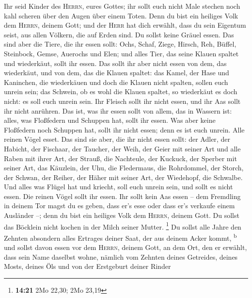  Ihr seid Kinder des \textsc{Herrn}, eures Gottes; ihr
sollt euch nicht Male stechen noch kahl scheren über den Augen über
einem Toten.  Denn du bist ein heiliges Volk dem
\textsc{Herrn}, deinem Gott; und der \textsc{Herr} hat dich erwählt,
dass du sein Eigentum seist, aus allen Völkern, die auf Erden sind.
 Du sollst keine Gräuel essen.  Das sind
aber die Tiere, die ihr essen sollt: Ochs, Schaf, Ziege, 
Hirsch, Reh, Büffel, Steinbock, Gemse, Auerochs und Elen; 
und alles Tier, das seine Klauen spaltet und wiederkäut, sollt ihr
essen.  Das sollt ihr aber nicht essen von dem, das
wiederkäut, und von dem, das die Klauen spaltet: das Kamel, der Hase und
Kaninchen, die wiederkäuen und doch die Klauen nicht spalten, sollen
euch unrein sein;  das Schwein, ob es wohl die Klauen
spaltet, so wiederkäut es doch nicht: es soll euch unrein sein. Ihr
Fleisch sollt ihr nicht essen, und ihr Aas sollt ihr nicht anrühren.
 Das ist, was ihr essen sollt von allem, das in Wassern
ist: alles, was Floßfedern und Schuppen hat, sollt ihr essen.
 Was aber keine Floßfedern noch Schuppen hat, sollt ihr
nicht essen; denn es ist euch unrein.  Alle reinen Vögel
esset.  Das sind sie aber, die ihr nicht essen sollt: der
Adler, der Habicht, der Fischaar,  der Taucher, der Weih,
der Geier mit seiner Art  und alle Raben mit ihrer Art,
 der Strauß, die Nachteule, der Kuckuck, der Sperber mit
seiner Art,  das Käuzlein, der Uhu, die Fledermaus,
 die Rohrdommel, der Storch, der Schwan, 
der Reiher, der Häher mit seiner Art, der Wiedehopf, die Schwalbe.
 Und alles was Flügel hat und kriecht, soll euch unrein
sein, und sollt es nicht essen.  Die reinen Vögel sollt
ihr essen.  Ihr sollt kein Aas essen -- dem Fremdling in
deinem Tor magst du es geben, dass er's esse oder dass er's verkaufe
einem Ausländer --; denn du bist ein heiliges Volk dem \textsc{Herrn},
deinem Gott. Du sollst das Böcklein nicht kochen in der Milch seiner
Mutter. \footnote{\textbf{14:21} 2Mo 22,30; 2Mo 23,19} 
Du sollst alle Jahre den Zehnten absondern alles Ertrages deiner Saat,
der aus deinem Acker kommt, \textsuperscript{b}  und
sollst davon essen vor dem \textsc{Herrn}, deinem Gott, an dem Ort, den
er erwählt, dass sein Name daselbst wohne, nämlich vom Zehnten deines
Getreides, deines Mosts, deines Öls und von der Erstgeburt deiner Rinder
